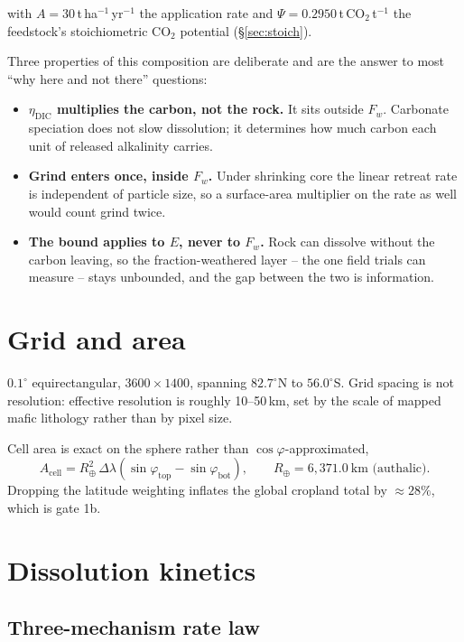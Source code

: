 \documentclass[11pt,a4paper]{article}
\newcommand{\cotwo}{\ensuremath{\mathrm{CO_2}}}
\begin{document}
with $A = 30$\,t\,ha$^{-1}$\,yr$^{-1}$ the application rate and
$\Psi = 0.2950$\,t\,\cotwo{}\,t$^{-1}$ the feedstock's stoichiometric
\cotwo{} potential (\S\ref{sec:stoich}).

Three properties of this composition are deliberate and are the answer to most
``why here and not there'' questions:

\begin{itemize}
\item \textbf{$\eta_{\mathrm{DIC}}$ multiplies the carbon, not the rock.} It sits
outside $F_w$. Carbonate speciation does not slow dissolution; it determines how
much carbon each unit of released alkalinity carries.
\item \textbf{Grind enters once, inside $F_w$.} Under shrinking core the linear
retreat rate is independent of particle size, so a surface-area multiplier on the
rate as well would count grind twice.
\item \textbf{The bound applies to $E$, never to $F_w$.} Rock can dissolve without
the carbon leaving, so the fraction-weathered layer -- the one field trials can
measure -- stays unbounded, and the gap between the two is information.
\end{itemize}

\section{Grid and area}

$0.1^\circ$ equirectangular, $3600\times1400$,
spanning $82.7^\circ$N to $56.0^\circ$S. Grid spacing is not resolution:
effective resolution is roughly 10--50\,km, set by the scale of mapped mafic
lithology rather than by pixel size.

Cell area is exact on the sphere rather than $\cos\varphi$-approximated,
\begin{equation}
A_{\mathrm{cell}} = R_\oplus^2 \,\Delta\lambda
   \left(\sin\varphi_{\mathrm{top}} - \sin\varphi_{\mathrm{bot}}\right),
\qquad R_\oplus = 6,371.0\ \text{km (authalic)} .
\end{equation}
Dropping the latitude weighting inflates the global cropland total by
$\approx 28\%$, which is gate 1b.

\section{Dissolution kinetics}
\label{sec:kinetics}

\subsection{Three-mechanism rate law}
\end{document}
